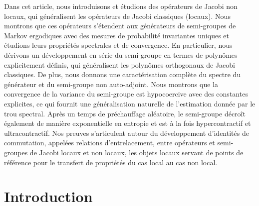 \documentclass[JEP,XML,SOM,Unicode]{cedram}
\theoremstyle{plain}
\theoremstyle{definition}
\begin{document}


\begin{altabstract}
Dans cet article, nous introduisons et étudions des opérateurs de Jacobi non locaux, qui généralisent les opérateurs de Jacobi classiques (locaux). Nous montrons que ces opérateurs s'étendent aux générateurs de semi-groupes de Markov ergodiques avec des mesures de probabilité invariantes uniques et étudions leurs propriétés spectrales et de convergence. En particulier, nous dérivons un développement en série du semi-groupe en termes de polynômes explicitement définis, qui généralisent les polynômes orthogonaux de Jacobi classiques. De plus, nous donnons une caractérisation complète du spectre du générateur et du semi-groupe non auto-adjoint. Nous montrons que la convergence de la variance du semi-groupe est hypocoercive avec des constantes explicites, ce qui fournit une généralisation naturelle de l'estimation donnée par le trou spectral. Après un temps de préchauffage aléatoire, le semi-groupe décroît également de manière exponentielle en entropie et est à la fois hypercontractif et ultracontractif. Nos preuves s'articulent autour du développement d'identités de commutation, appelées relations d'entrelacement, entre opérateurs et semi-groupes de Jacobi locaux et non locaux, les objets locaux servant de points de référence pour le transfert de propriétés du cas local au cas non local.
\end{altabstract}

\maketitle
\enlargethispage{-1.5\baselineskip}%
\tableofcontents

\section{Introduction}
\end{document}
